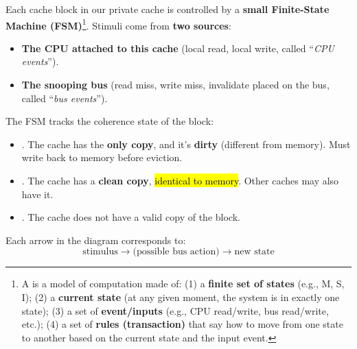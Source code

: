 \highspace
Each cache block in our private cache is controlled by a \textbf{small Finite-State Machine (FSM)}\footnote{%
    A  is a model of computation made of: (1) a \textbf{finite set of states} (e.g., M, S, I); (2) a \textbf{current state} (at any given moment, the system is in exactly one state); (3) a set of \textbf{event/inputs} (e.g., CPU read/write, bus read/write, etc.); (4) a set of \textbf{rules (transaction)} that say how to move from one state to another based on the current state and the input event.
}. Stimuli come from \textbf{two sources}:
\begin{itemize}
    \item \textbf{The CPU attached to this cache} (local read, local write, called ``\emph{CPU events}'').
    \item \textbf{The snooping bus} (read miss, write miss, invalidate placed on the bus, called ``\emph{bus events}'').
\end{itemize}
The FSM tracks the coherence state of the block:
\begin{itemize}
    \item {}. The cache has the \textbf{only copy}, and it's \textbf{dirty} (different from memory). Must write back to memory before eviction.
    \item {}. The cache has a \textbf{clean copy}, \hl{identical to memory}. Other caches may also have it.
    \item {}. The cache does not have a valid copy of the block.
\end{itemize}
Each arrow in the diagram corresponds to:
\begin{equation*}
    \text{stimulus} \rightarrow \text{(possible bus action)} \rightarrow \text{new state}
\end{equation*}

\newpage


